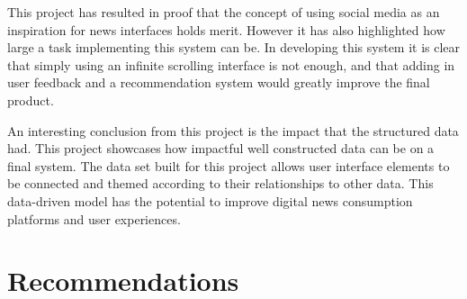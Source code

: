 \documentclass[12pt,titlepage]{article}
\begin{document}
  This project has resulted in proof that the concept of using social media as
  an inspiration for news interfaces holds merit. However it has also highlighted
  how large a task implementing this system can be. In developing this system it
  is clear that simply using an infinite scrolling interface is not enough, and
  that adding in user feedback and a recommendation system would greatly improve
  the final product.

  An interesting conclusion from this project is the impact that the structured
  data had. This project showcases how impactful well constructed data can be on
  a final system. The data set built for this project allows user interface
  elements to be connected and themed according to their relationships to other
  data. This data-driven model has the potential to improve digital news
  consumption platforms and user experiences.

\section{Recommendations}



\end{document}
